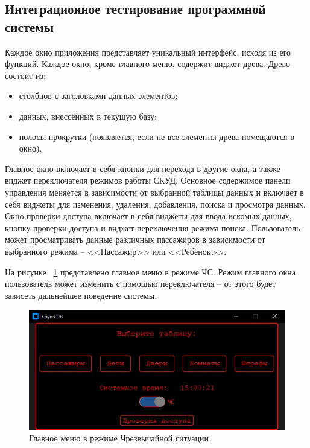 \subsection{Интеграционное тестирование программной системы}
Каждое окно приложения представляет уникальный интерфейс, исходя из его функций.  Каждое окно, кроме главного меню, содержит виджет древа.
Древо состоит из:
\begin{itemize}
	\item столбцов с заголовками данных элементов;
	\item данных, внессённых в текущую базу;
	\item полосы прокрутки (появляется, если не все элементы древа помещаются в окно).
\end{itemize}
Главное окно включает в себя кнопки для перехода в другие окна, а также виджет переключателя режимов работы СКУД.
Основное содержимое панели управления меняется в зависимости от выбранной таблицы данных и включает в себя виджеты для изменения, удаления, добавления, поиска и просмотра данных.
Окно проверки доступа включает в себя виджеты для ввода искомых данных, кнопку проверки доступа и виджет переключения режима поиска. Пользователь может просматривать данные различных пассажиров в зависимости от выбранного режима -- <<Пассажир>> или <<Ребёнок>>.

На рисунке ~\ref{fig:example4} представлено главное меню в режиме ЧС.
Режим главного окна пользователь может изменить с помощью переключателя -- от этого будет зависеть дальнейшее поведение системы.
\begin{figure}[ht]
	\centering
	\includegraphics[width=1\linewidth]{images/Example4}
	\caption{Главное меню в режиме Чрезвычайной ситуации}
	\label{fig:example4}
\end{figure}

